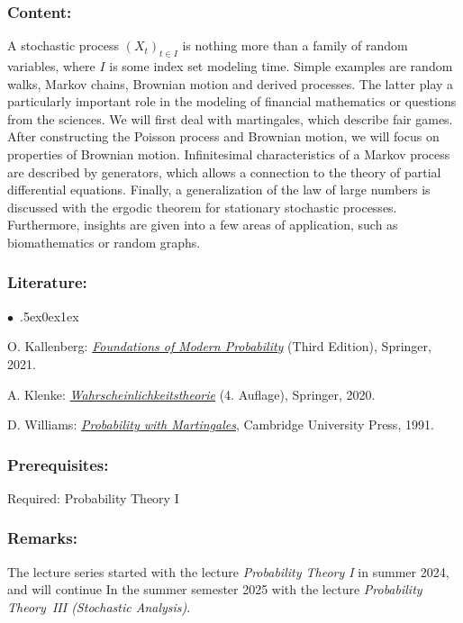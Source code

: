 \documentclass[a4paper,10pt]{article}
\renewenvironment{itemize}{\begin{list}{$\bullet$\ }{\itemsep.5ex\setlength{\topsep}{0.5\itemsep}\parsep0ex\labelsep1ex\settowidth{\labelwidth}{$\bullet$\ }\setlength{\leftmargin}{\labelwidth}\addtolength{\leftmargin}{3ex}\addtolength{\leftmargin}{\labelsep}}}{\end{list}}
\begin{document}
\subsubsection*{\large
    Content:
}
A stochastic process $(X_t)_{t\in I}$ is nothing more than a family of random variables, where $I$ is some index set modeling time. Simple examples are random walks, Markov chains, Brownian motion and derived processes. The latter play a particularly important role in the modeling of financial mathematics or questions from the sciences. We will first deal with martingales, which describe fair games. After constructing the Poisson process and Brownian motion, we will focus on properties of Brownian motion. Infinitesimal characteristics of a Markov process are described by generators, which allows a connection to the theory of partial differential equations. Finally, a generalization of the law of large numbers is discussed with the ergodic theorem for stationary stochastic processes. Furthermore, insights are given into a few areas of application, such as biomathematics or random graphs.
\subsubsection*{\large
    Literature:
}
\begin{itemize}
\item
 O. Kallenberg: \href{https://link.springer.com/book/10.1007/978-3-030-61871-1}{\emph{Foundations of Modern Probability}} (Third Edition), Springer, 2021.
\item
 A. Klenke: \href{https://link.springer.com/book/10.1007/978-3-662-62089-2}{\emph{Wahrscheinlichkeitstheorie}} (4. Auf\/lage), Springer, 2020. 
\item 
D. Williams: \href{https://edisciplinas.usp.br/pluginfile.php/343758/mod_folder/content/0/Probability With Martingales(Williams).pdf}{\emph{Probability with Martingales}}, Cambridge University Press, 1991. 
\end{itemize}
\subsubsection*{\large
    Prerequisites:
}
Required: Probability Theory I
\subsubsection*{\large
    Remarks:
}
The lecture series started with the lecture {\em Probability Theory I} in summer 2024, and will continue In the summer semester 2025 with the lecture {\em Probability Theory~III (Stochastic Analysis)}.
\cleardoublepage
\end{document}
